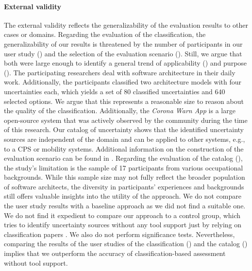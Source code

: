 \paragraph*{External validity}
The external validity reflects the generalizability of the evaluation results to other cases or domains.
Regarding the evaluation of the classification, the generalizability of our results is threatened by the number of participants in our user study () and the selection of the evaluation scenario ().
Still, we argue that both were large enough to identify a general trend of applicability () and purpose ().
The participating researchers deal with software architecture in their daily work.
Additionally, the participants classified two architecture models with four uncertainties each, which yields a set of 80 classified uncertainties and 640 selected options.
We argue that this represents a reasonable size to reason about the quality of the classification.
Additionally, the \emph{Corona Warn App} is a large open-source system that was actively observed by the community during the time of this research.
Our catalog of uncertainty shows that the identified uncertainty sources are independent of the domain and can be applied to other systems, e.g., to a \acf{CPS} or mobility systems.
Additional information on the construction of the evaluation scenario can be found in \cite{benkler_architecture-based_2022}.
Regarding the evaluation of the catalog (), the study's limitation is the sample of 17 participants from various occupational backgrounds. 
While this sample size may not fully reflect the broader population of software architects, the diversity in participants' experiences and backgrounds still offers valuable insights into the utility of the approach. 
We do not compare the user study results with a baseline approach as we did not find a suitable one.
We do not find it expedient to compare our approach to a control group, which tries to identify uncertainty sources without any tool support just by relying on classification papers \cite{hahner_classification_2023,ramirez_taxonomy_2012}.
We also do not perform significance tests.
Nevertheless, comparing the results of the user studies of the classification () and the catalog () implies that we outperform the accuracy of classification-based assessment without tool support.


